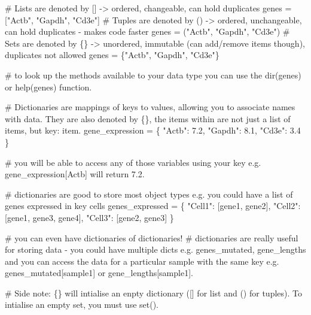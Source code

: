 \documentclass[
  letterpaper,
  DIV=11,
  numbers=noendperiod]{scrartcl}
\newenvironment{Shaded}{\begin{snugshade}}{\end{snugshade}}
\newcommand{\CommentTok}[1]{\textcolor[rgb]{0.37,0.37,0.37}{#1}}
\newcommand{\FloatTok}[1]{\textcolor[rgb]{0.68,0.00,0.00}{#1}}
\newcommand{\NormalTok}[1]{\textcolor[rgb]{0.00,0.23,0.31}{#1}}
\newcommand{\OperatorTok}[1]{\textcolor[rgb]{0.37,0.37,0.37}{#1}}
\newcommand{\StringTok}[1]{\textcolor[rgb]{0.13,0.47,0.30}{#1}}
\begin{document}
\begin{Shaded}
\begin{Highlighting}[]
\CommentTok{\# Lists are denoted by []   {-}\textgreater{} ordered, changeable, can hold duplicates}
\NormalTok{genes }\OperatorTok{=}\NormalTok{ [}\StringTok{"Actb"}\NormalTok{, }\StringTok{"Gapdh"}\NormalTok{, }\StringTok{"Cd3e"}\NormalTok{]}
\CommentTok{\# Tuples are denoted by ()  {-}\textgreater{} ordered, unchangeable, can hold duplicates {-} makes code faster}
\NormalTok{genes }\OperatorTok{=}\NormalTok{ (}\StringTok{"Actb"}\NormalTok{, }\StringTok{"Gapdh"}\NormalTok{, }\StringTok{"Cd3e"}\NormalTok{)}
\CommentTok{\# Sets are denoted by \{\}    {-}\textgreater{} unordered, immutable (can add/remove items though), duplicates not allowed   }
\NormalTok{genes }\OperatorTok{=}\NormalTok{ \{}\StringTok{"Actb"}\NormalTok{, }\StringTok{"Gapdh"}\NormalTok{, }\StringTok{"Cd3e"}\NormalTok{\}}

\CommentTok{\# to look up the methods available to your data type you can use the dir(genes) or help(genes) function.}

\CommentTok{\# Dictionaries are mappings of keys to values, allowing you to associate names with data. They are also denoted by \{\}, the items within are not just a list of items, but key: item.}
\NormalTok{gene\_expression }\OperatorTok{=}\NormalTok{ \{}
    \StringTok{"Actb"}\NormalTok{: }\FloatTok{7.2}\NormalTok{,}
    \StringTok{"Gapdh"}\NormalTok{: }\FloatTok{8.1}\NormalTok{,}
    \StringTok{"Cd3e"}\NormalTok{: }\FloatTok{3.4}
\NormalTok{\}}

\CommentTok{\# you will be able to access any of those variables using your key e.g. gene\_expression[\textquotesingle{}Actb\textquotesingle{}] will return 7.2.}

\CommentTok{\# dictionaries are good to store most object types e.g. you could have a list of genes expressed in key cells}
\NormalTok{genes\_expressed }\OperatorTok{=}\NormalTok{ \{}
    \StringTok{"Cell1"}\NormalTok{: [}\StringTok{\textquotesingle{}gene1\textquotesingle{}}\NormalTok{, }\StringTok{\textquotesingle{}gene2\textquotesingle{}}\NormalTok{],}
    \StringTok{"Cell2"}\NormalTok{: [}\StringTok{\textquotesingle{}gene1\textquotesingle{}}\NormalTok{, }\StringTok{\textquotesingle{}gene3\textquotesingle{}}\NormalTok{, }\StringTok{\textquotesingle{}gene4\textquotesingle{}}\NormalTok{],}
    \StringTok{"Cell3"}\NormalTok{: [}\StringTok{\textquotesingle{}gene2\textquotesingle{}}\NormalTok{, }\StringTok{\textquotesingle{}gene3\textquotesingle{}}\NormalTok{]}
\NormalTok{\}}

\CommentTok{\# you can even have dictionaries of dictionaries!}
\CommentTok{\# dictionaries are really useful for storing data {-} you could have multiple dicts e.g. genes\_mutated, gene\_lengths and you can access the data for a particular sample with the same key e.g. genes\_mutated[\textquotesingle{}sample1\textquotesingle{}] or gene\_lengths[\textquotesingle{}sample1\textquotesingle{}].}

\CommentTok{\# Side note: \{\} will intialise an enpty dictionary ([] for list and () for tuples). To intialise an empty set, you must use set().}
\end{Highlighting}
\end{Shaded}
\end{document}
